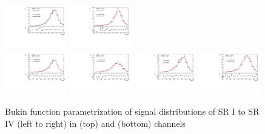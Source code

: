  
\begin{figure}[htbp]
  \centering    
 \includegraphics[width=0.24\textwidth]{figures/VBF/sig_2cen_SRI.pdf}
 \includegraphics[width=0.24\textwidth]{figures/VBF/sig_2cen_SRII.pdf}\\
 \includegraphics[width=0.24\textwidth]{figures/VBF/sig_4cen_SRI.pdf}
 \includegraphics[width=0.24\textwidth]{figures/VBF/sig_4cen_SRII.pdf}
 \includegraphics[width=0.24\textwidth]{figures/VBF/sig_4cen_SRIII.pdf}
 \includegraphics[width=0.24\textwidth]{figures/VBF/sig_4cen_SRIV.pdf}

\caption{Bukin function parametrization of signal \Mbb{} distributions of SR I to SR IV (left to right) in \twocentral (top) and \fourcentral (bottom) channels}
  \label{fig:vbf-sigpar_alt}
\end{figure}


